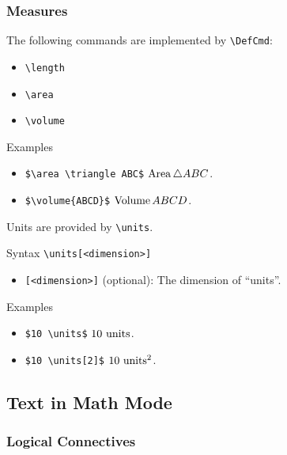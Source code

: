 \subsubsection{Measures}

The following commands are implemented by \verb|\DefCmd|:

\begin{multicols}{3}
    \begin{itemize}
        \item \verb|\length|
        \item \verb|\area|
        \item \verb|\volume|
    \end{itemize}
\end{multicols}

\begin{myframe}{Examples}
    \begin{itemize}
        \item \verb|$\area \triangle ABC$| \produces{} $\operatorname{Area} \triangle ABC$.
        \item \verb|$\volume{ABCD}$| \produces{} $\operatorname{Volume}{ABCD}$.
    \end{itemize}
\end{myframe}

Units are provided by \verb|\units|.

\begin{myframe}{Syntax }
    \verb|\units[<dimension>]|
    \begin{itemize}
        \item \verb|[<dimension>]| (optional): The dimension of ``units''.
    \end{itemize}
\end{myframe}

\begin{myframe}{Examples }
    \begin{itemize}
        \item \verb|$10 \units$| \produces{} $10 \units$.
        \item \verb|$10 \units[2]$| \produces{} $10 \units[2]$.
    \end{itemize}
\end{myframe}

\subsection{Text in Math Mode}

\subsubsection{Logical Connectives}

